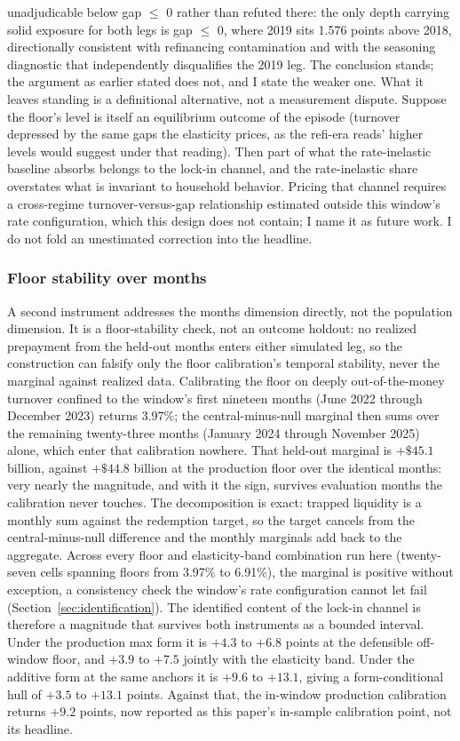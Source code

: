 \documentclass[12pt]{article}
\begin{document}
unadjudicable below gap $\leq$ 0 rather than refuted there: the only depth carrying solid exposure for both legs is gap $\leq$ 0, where 2019 sits 1.576 points above 2018, directionally consistent with refinancing contamination and with the seasoning diagnostic that independently disqualifies the 2019 leg. The conclusion stands; the argument as earlier stated does not, and I state the weaker one. What it leaves standing is a definitional alternative, not a measurement dispute. Suppose the floor's level is itself an equilibrium outcome of the episode (turnover depressed by the same gaps the elasticity prices, as the refi-era reads' higher levels would suggest under that reading). Then part of what the rate-inelastic baseline absorbs belongs to the lock-in channel, and the rate-inelastic share overstates what is invariant to household behavior. Pricing that channel requires a cross-regime turnover-versus-gap relationship estimated outside this window's rate configuration, which this design does not contain; I name it as future work. I do not fold an unestimated correction into the headline.

\subsubsection{Floor stability over months}

A second instrument addresses the months dimension directly, not the population dimension. It is a floor-stability check, not an outcome holdout: no realized prepayment from the held-out months enters either simulated leg, so the construction can falsify only the floor calibration's temporal stability, never the marginal against realized data. Calibrating the floor on deeply out-of-the-money turnover confined to the window's first nineteen months (June 2022 through December 2023) returns 3.97\%; the central-minus-null marginal then sums over the remaining twenty-three months (January 2024 through November 2025) alone, which enter that calibration nowhere. That held-out marginal is $+\$45.1$ billion, against $+\$44.8$ billion at the production floor over the identical months: very nearly the magnitude, and with it the sign, survives evaluation months the calibration never touches. The decomposition is exact: trapped liquidity is a monthly sum against the redemption target, so the target cancels from the central-minus-null difference and the monthly marginals add back to the aggregate. Across every floor and elasticity-band combination run here (twenty-seven cells spanning floors from 3.97\% to 6.91\%), the marginal is positive without exception, a consistency check the window's rate configuration cannot let fail (Section~\ref{sec:identification}). The identified content of the lock-in channel is therefore a magnitude that survives both instruments as a bounded interval. Under the production max form it is $+4.3$ to $+6.8$ points at the defensible off-window floor, and $+3.9$ to $+7.5$ jointly with the elasticity band. Under the additive form at the same anchors it is $+9.6$ to $+13.1$, giving a form-conditional hull of $+3.5$ to $+13.1$ points. Against that, the in-window production calibration returns $+9.2$ points, now reported as this paper's in-sample calibration point, not its headline.
\end{document}
